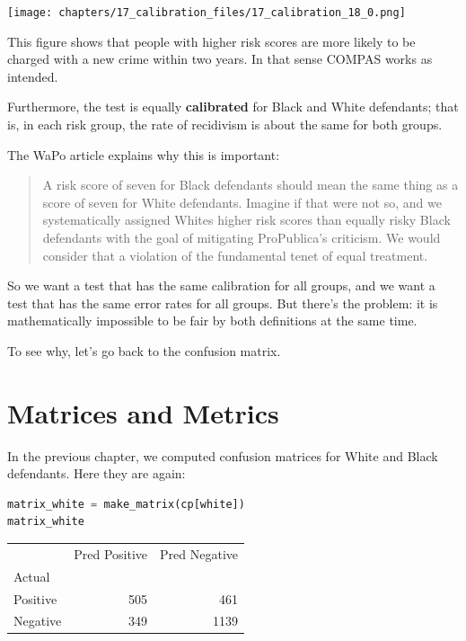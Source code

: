 \begin{center}
\texttt{[image: chapters/17\_calibration\_files/17\_calibration\_18\_0.png]}
\end{center}

This figure shows that people with higher risk scores are more likely to
be charged with a new crime within two years. In that sense COMPAS works
as intended.

Furthermore, the test is equally \textbf{calibrated} for Black and White
defendants; that is, in each risk group, the rate of recidivism is about
the same for both groups.

The WaPo article explains why this is important:

\begin{quote}
A risk score of seven for Black defendants should mean the same thing as
a score of seven for White defendants. Imagine if that were not so, and
we systematically assigned Whites higher risk scores than equally risky
Black defendants with the goal of mitigating ProPublica's criticism. We
would consider that a violation of the fundamental tenet of equal
treatment.
\end{quote}

So we want a test that has the same calibration for all groups, and we
want a test that has the same error rates for all groups. But there's
the problem: it is mathematically impossible to be fair by both
definitions at the same time.

To see why, let's go back to the confusion matrix.

\section{Matrices and Metrics}\label{matrices-and-metrics}

In the previous chapter, we computed confusion matrices for White and
Black defendants. Here they are again:

\begin{lstlisting}[language=Python,style=source]
matrix_white = make_matrix(cp[white])
matrix_white
\end{lstlisting}

\begin{tabular}{lrr}
\midrule
 & Pred Positive & Pred Negative \\
Actual &  &  \\
\midrule
Positive & 505 & 461 \\
Negative & 349 & 1139 \\
\midrule
\end{tabular}

